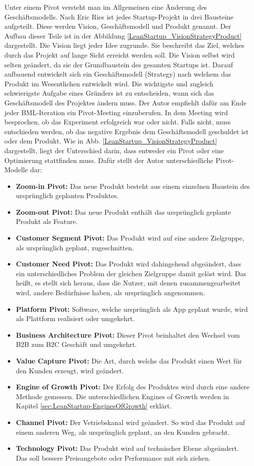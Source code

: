 Unter einem Pivot versteht man im Allgemeinen eine Änderung des Geschäftsmodells. Nach Eric Ries ist jedes Startup-Projekt in drei Bausteine aufgeteilt. Diese werden Vision, Geschäftsmodell und Produkt genannt. Der Aufbau dieser Teile ist in der Abbildung \ref{LeanStartup_VisionStrategyProduct} dargestellt. 
Die Vision liegt jeder Idee zugrunde. Sie beschreibt das Ziel, welches durch das Projekt auf lange Sicht erreicht werden soll. Die Vision selbst wird selten geändert, da sie der Grundbaustein des gesamten Startups ist. Darauf aufbauend entwickelt sich ein Geschäftsmodell (Strategy) nach welchem das Produkt im Wesentlichen entwickelt wird. Die wichtigste und zugleich schwierigste Aufgabe eines Gründers ist zu entscheiden, wann sich das Geschäftsmodell des Projektes ändern muss. Der Autor empfiehlt dafür am Ende jeder \ac{BML}-Iteration ein Pivot-Meeting einzuberufen. In dem Meeting wird besprochen, ob das Experiment erfolgreich war oder nicht. Falls nicht, muss entschieden werden, ob das negative Ergebnis dem Geschäftsmodell geschuldet ist oder dem Produkt. Wie in Abb. \ref{LeanStartup_VisionStrategyProduct} dargestellt, liegt der Unterschied darin, dass entweder ein Pivot oder eine Optimierung stattfinden muss. Dafür stellt der Autor unterschiedliche Pivot-Modelle dar:
\begin{itemize}
	\item \textbf{Zoom-in Pivot:} Das neue Produkt besteht aus einem einzelnen Baustein des ursprünglich geplanten Produktes.
	\item \textbf{Zoom-out Pivot:} Das neue Produkt enthält das ursprünglich geplante Produkt als Feature.
	\item \textbf{Customer Segment Pivot:} Das Produkt wird auf eine andere Zielgruppe, als ursprünglich geplant, zugeschnitten.
	\item \textbf{Customer Need Pivot:} Das Produkt wird dahingehend abgeändert, dass ein unterschiedliches Problem der gleichen Zielgruppe damit gelöst wird. Das heißt, es stellt sich heraus, dass die Nutzer, mit denen zusammengearbeitet wird, andere Bedürfnisse haben, als ursprünglich angenommen.
	\item \textbf{Platform Pivot:} Software, welche ursprünglich als App geplant wurde, wird als Plattform realisiert oder umgekehrt.
	\item \textbf{Business Architecture Pivot:} Dieser Pivot beinhaltet den Wechsel vom B2B zum B2C Geschäft und umgekehrt.
	\item \textbf{Value Capture Pivot:} Die Art, durch welche das Produkt einen Wert für den Kunden erzeugt, wird geändert. 
	\item \textbf{Engine of Growth Pivot:} Der Erfolg des Produktes wird durch eine andere Methode gemessen. Die unterschiedlichen Engines of Growth werden in Kapitel \ref{sec:LeanStartup-EnginesOfGrowth} erklärt.
	\item \textbf{Channel Pivot:} Der Vetriebskanal wird geändert. So wird das Produkt auf einem anderen Weg, als ursprünglich geplant, an den Kunden gebracht.
	\item \textbf{Technology Pivot:} Das Produkt wird auf technischer Ebene abgeändert. Das soll bessere Preisangebote oder Performance mit sich ziehen.
\end{itemize}
